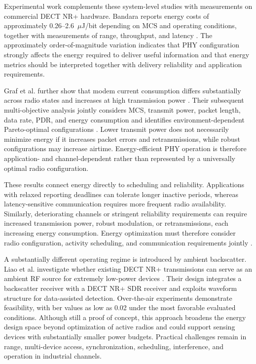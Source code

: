 Experimental work complements these system-level studies with measurements on
commercial DECT NR+ hardware. Bandara reports energy costs of approximately
0.26--2.6~$\mu$J/bit depending on MCS and operating conditions, together with
measurements of range, throughput, and latency
\cite{bandaraExperimentalValidationAnalysis2025}. The approximately
order-of-magnitude variation indicates that PHY configuration strongly affects
the energy required to deliver useful information and that energy metrics
should be interpreted together with delivery reliability and application
requirements.

Graf et al. further show that modem current consumption differs substantially
across radio states and increases at high transmission power
\cite{grafWhatExpectWhen2026}. Their subsequent multi-objective analysis
jointly considers MCS, transmit power, packet length, data rate, PDR, and
energy consumption and identifies environment-dependent Pareto-optimal
configurations
\cite{grafParetoOptimalityApproach2026a}. Lower transmit power does not
necessarily minimize energy if it increases packet errors and retransmissions,
while robust configurations may increase airtime. Energy-efficient PHY
operation is therefore application- and channel-dependent rather than
represented by a universally optimal radio configuration.

These results connect energy directly to scheduling and reliability.
Applications with relaxed reporting deadlines can tolerate longer inactive
periods, whereas latency-sensitive communication requires more frequent radio
availability. Similarly, deteriorating channels or stringent reliability
requirements can require increased transmission power, robust modulation, or
retransmissions, each increasing energy consumption. Energy optimization must
therefore consider radio configuration, activity scheduling, and communication
requirements jointly
\cite{nihtilaEnergyConsumptionDECT20202022,
bandaraExperimentalValidationAnalysis2025,
grafParetoOptimalityApproach2026a}.

A substantially different operating regime is introduced by ambient
backscatter. Liao et al. investigate whether existing DECT NR+ transmissions
can serve as an ambient RF source for extremely low-power devices
\cite{liaoDataAssistedBackscatter2025}. Their design integrates a backscatter
receiver with a DECT NR+ SDR receiver and exploits waveform structure for
data-assisted detection. Over-the-air experiments demonstrate feasibility,
with \gls{ber} values as low as 0.02 under the most favorable evaluated
conditions. Although still a proof of concept, this approach broadens the
energy design space beyond optimization of active radios and could support
sensing devices with substantially smaller power budgets. Practical
challenges remain in range, multi-device access, synchronization, scheduling,
interference, and operation in industrial channels.

